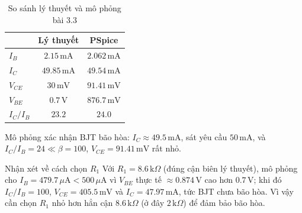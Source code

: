 \begin{table}[H]
\centering
\begin{tabular}{l|c|c}
\toprule
 & Lý thuyết & PSpice \\
\midrule
$I_B$ & $2.15\,\text{mA}$ & $2.062\,\text{mA}$ \\
$I_C$ & $49.85\,\text{mA}$ & $49.54\,\text{mA}$ \\
$V_{CE}$ & $30\,\text{mV}$ & $91.41\,\text{mV}$ \\
$V_{BE}$ & $0.7\,\text{V}$ & $876.7\,\text{mV}$ \\
$I_C/I_B$ & $23.2$ & $24.0$ \\
\bottomrule
\end{tabular}
\caption{So sánh lý thuyết và mô phỏng bài 3.3}
\end{table}

Mô phỏng xác nhận BJT bão hòa: $I_C \approx 49.5\,\text{mA}$, sát yêu cầu $50\,\text{mA}$, và $I_C/I_B = 24 \ll \beta = 100$, $V_{CE} = 91.41\,\text{mV}$ rất nhỏ.

\begin{notebox}{Nhận xét về cách chọn $R_1$}
Với $R_1 = 8.6\,\text{k}\Omega$ (đúng cận biên lý thuyết), mô phỏng cho $I_B = 479.7\,\mu\text{A} < 500\,\mu\text{A}$ vì $V_{BE}$ thực tế $\approx 0.874\,\text{V}$ cao hơn $0.7\,\text{V}$; khi đó $I_C/I_B = 100$, $V_{CE} = 405.5\,\text{mV}$ và $I_C = 47.97\,\text{mA}$, tức BJT chưa bão hòa. Vì vậy cần chọn $R_1$ nhỏ hơn hẳn cận $8.6\,\text{k}\Omega$ (ở đây $2\,\text{k}\Omega$) để đảm bảo bão hòa.
\end{notebox}
